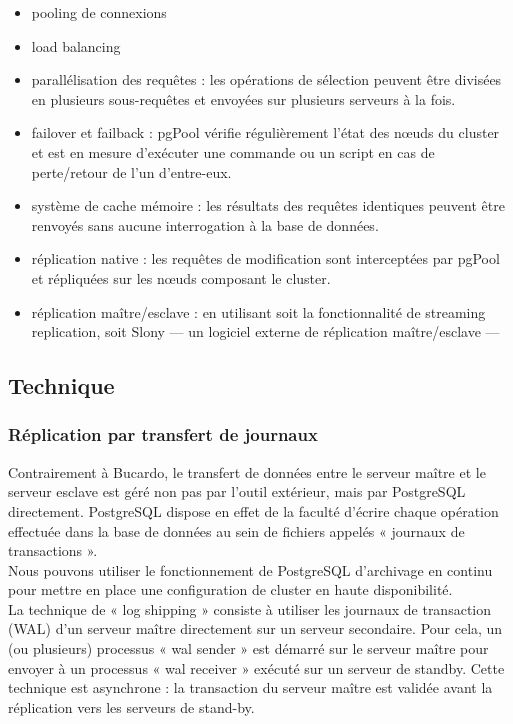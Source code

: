 \documentclass[12pt]{report}
\begin{document}
\begin{itemize}
\item pooling de connexions
\item load balancing
\item parallélisation des requêtes : les opérations de sélection peuvent être
  divisées en plusieurs sous-requêtes et envoyées sur plusieurs serveurs à la
  fois.
\item failover et failback : pgPool vérifie régulièrement l'état des nœuds du
  cluster et est en mesure d'exécuter une commande ou un script en cas de
  perte/retour de l'un d'entre-eux.
\item système de cache mémoire : les résultats des requêtes identiques peuvent
  être renvoyés sans aucune interrogation à la base de données.
\item réplication native : les requêtes de modification sont interceptées par
  pgPool et répliquées sur les nœuds composant le cluster.
\item réplication maître/esclave : en utilisant soit la fonctionnalité de
  streaming replication, soit Slony — un logiciel externe de réplication
  maître/esclave —
\end{itemize}


\subsection{Technique}
\subsubsection{Réplication par transfert de journaux}

Contrairement à Bucardo, le transfert de données entre le serveur maître et le
serveur esclave est géré non pas par l'outil extérieur, mais par PostgreSQL
directement. PostgreSQL dispose en effet de la faculté d'écrire chaque
opération effectuée dans la base de données au sein de fichiers appelés «
  journaux de transactions ». \\

Nous pouvons utiliser le fonctionnement de PostgreSQL d’archivage en continu pour
mettre en place une configuration de cluster en haute disponibilité. \\

La technique de « log shipping » consiste à utiliser les journaux de transaction (WAL)
d’un serveur maître directement sur un serveur secondaire. Pour cela, un (ou plusieurs)
processus « wal sender » est démarré sur le serveur maître pour envoyer à un processus
« wal receiver » exécuté sur un serveur de standby. Cette technique est asynchrone : la
transaction du serveur maître est validée avant la réplication vers les serveurs
de stand-by. \\
\end{document}

